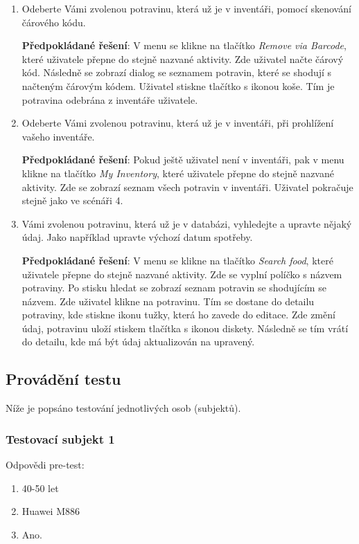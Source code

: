 \documentclass[thesis=B,czech]{FITthesis}[2013/10/20]
\begin{document}
\begin{enumerate}
  \item Odeberte Vámi zvolenou potravinu, která už je v inventáři, pomocí skenování čárového kódu.
    
    \textbf{Předpokládané řešení}: V menu se klikne na tlačítko \textit{Remove via Barcode}, které uživatele přepne do stejně nazvané aktivity. Zde uživatel načte čárový kód. Následně se zobrazí dialog se seznamem potravin, které se shodují s načteným čárovým kódem. Uživatel stiskne tlačítko s ikonou koše. Tím je potravina odebrána z inventáře uživatele.
  
  \item Odeberte Vámi zvolenou potravinu, která už je v inventáři, při prohlížení vašeho inventáře.
    
    \textbf{Předpokládané řešení}: Pokud ještě uživatel není v inventáři, pak v menu klikne na tlačítko \textit{My Inventory}, které uživatele přepne do stejně nazvané aktivity. Zde se zobrazí seznam všech potravin v inventáři. Uživatel pokračuje stejně jako ve scénáři 4.
  
  \item Vámi zvolenou potravinu, která už je v databázi, vyhledejte a upravte nějaký údaj. Jako například upravte výchozí datum spotřeby.
    
    \textbf{Předpokládané řešení}: V menu se klikne na tlačítko \textit{Search food}, které uživatele přepne do stejně nazvané aktivity. Zde se vyplní políčko s názvem potraviny. Po stisku hledat se zobrazí seznam potravin se shodujícím se názvem. Zde uživatel klikne na potravinu. Tím se dostane do detailu potraviny, kde stiskne ikonu tužky, která ho zavede do editace. Zde změní údaj, potravinu uloží stiskem tlačítka s ikonou diskety. Následně se tím vrátí do detailu, kde má být údaj aktualizován na upravený.
  
\end{enumerate}

\subsection{Provádění testu}

Níže je popsáno testování jednotlivých osob (subjektů).

\subsubsection{Testovací subjekt 1}

Odpovědi pre-test:

\begin{enumerate}
  \item 40-50 let
  \item Huawei M886
  \item Ano.
\end{enumerate}
\end{document}
